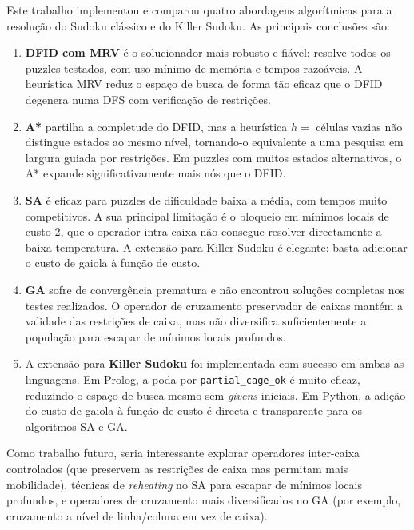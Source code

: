 Este trabalho implementou e comparou quatro abordagens algorítmicas para a resolução do Sudoku clássico e do Killer Sudoku. As principais conclusões são:

\begin{enumerate}
    \item \textbf{DFID com MRV} é o solucionador mais robusto e fiável: resolve todos os puzzles testados, com uso mínimo de memória e tempos razoáveis. A heurística MRV reduz o espaço de busca de forma tão eficaz que o DFID degenera numa DFS com verificação de restrições.

    \item \textbf{A*} partilha a completude do DFID, mas a heurística $h = $ células vazias não distingue estados ao mesmo nível, tornando-o equivalente a uma pesquisa em largura guiada por restrições. Em puzzles com muitos estados alternativos, o A* expande significativamente mais nós que o DFID.

    \item \textbf{SA} é eficaz para puzzles de dificuldade baixa a média, com tempos muito competitivos. A sua principal limitação é o bloqueio em mínimos locais de custo 2, que o operador intra-caixa não consegue resolver directamente a baixa temperatura. A extensão para Killer Sudoku é elegante: basta adicionar o custo de gaiola à função de custo.

    \item \textbf{GA} sofre de convergência prematura e não encontrou soluções completas nos testes realizados. O operador de cruzamento preservador de caixas mantém a validade das restrições de caixa, mas não diversifica suficientemente a população para escapar de mínimos locais profundos.

    \item A extensão para \textbf{Killer Sudoku} foi implementada com sucesso em ambas as linguagens. Em Prolog, a poda por \texttt{partial\_cage\_ok} é muito eficaz, reduzindo o espaço de busca mesmo sem \emph{givens} iniciais. Em Python, a adição do custo de gaiola à função de custo é directa e transparente para os algoritmos SA e GA.
\end{enumerate}

Como trabalho futuro, seria interessante explorar operadores inter-caixa controlados (que preservem as restrições de caixa mas permitam mais mobilidade), técnicas de \emph{reheating} no SA para escapar de mínimos locais profundos, e operadores de cruzamento mais diversificados no GA (por exemplo, cruzamento a nível de linha/coluna em vez de caixa).
